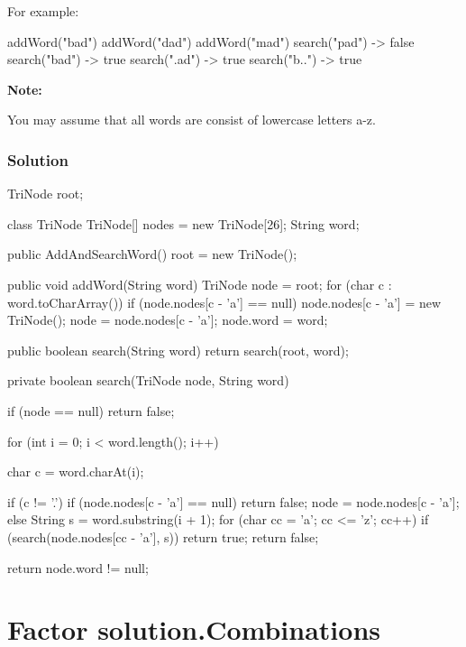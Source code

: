 For example:
\begin{Code}
addWord("bad")
addWord("dad")
addWord("mad")
search("pad") -> false
search("bad") -> true
search(".ad") -> true
search("b..") -> true
\end{Code}
\textbf{Note:}

You may assume that all words are consist of lowercase letters a-z.

\subsubsection{Solution}

\begin{Code}
TriNode root;

class TriNode {
    TriNode[] nodes = new TriNode[26];
    String word;
}

public AddAndSearchWord() {
    root = new TriNode();
}

public void addWord(String word) {
    TriNode node = root;
    for (char c : word.toCharArray()) {
        if (node.nodes[c - 'a'] == null) {
            node.nodes[c - 'a'] = new TriNode();
        }
        node = node.nodes[c - 'a'];
    }
    node.word = word;
}

public boolean search(String word) {
    return search(root, word);
}

\end{Code}

\newpage
\begin{Code}
private boolean search(TriNode node, String word) {
    if (node == null) {
        return false;
    }

    for (int i = 0; i < word.length(); i++) {
        char c = word.charAt(i);

        if (c != '.') {
            if (node.nodes[c - 'a'] == null) {
                return false;
            }
            node = node.nodes[c - 'a'];
        } else {
            String s = word.substring(i + 1);
            for (char cc = 'a'; cc <= 'z'; cc++) {
                if (search(node.nodes[cc - 'a'], s)) {
                    return true;
                }
            }
            return false;
        }
    }

    return node.word != null;
}
\end{Code}

\newpage

\section{Factor solution.Combinations} %
